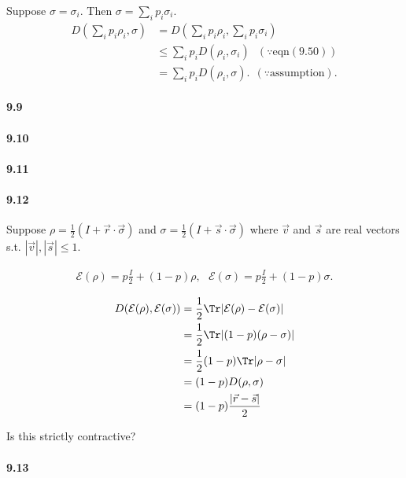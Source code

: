 Suppose $\sigma = \sigma_i$. Then $\sigma = \sum_i p_i \sigma_i$.
\begin{align}
	D \left( \sum_i p_i \rho_i, \sigma\right) &= D \left( \sum_i p_i \rho_i, \sum_i p_i \sigma_i\right)\\
		&\leq \sum_i p_i D(\rho_i, \sigma_i) ~~~ (\because \text{eqn}(9.50))\\
		&= \sum_i p_i D(\rho_i, \sigma).~~(\because \text{assumption}).
\end{align}

\paragraph{9.9}
\paragraph{9.10}
\paragraph{9.11}
\paragraph{9.12}

Suppose $\rho = \frac{1}{2} (I + \vec{r}\cdot \vec{\sigma})$ and $\sigma = \frac{1}{2} (I + \vec{s}\cdot \vec{\sigma})$ where $\vec{v}$ and $\vec{s}$ are real vectors s.t. $|\vec{v}|, |\vec{s}| \leq 1$.

\begin{align*}
	\mathcal{E} (\rho) = p \frac{I}{2} + (1-p) \rho, ~~~
	\mathcal{E}(\sigma) = p \frac{I}{2} + (1-p) \sigma.
\end{align*}

\begin{align*}
	D(\mathcal{E}(\rho), \mathcal{E}(\sigma)) &= \frac{1}{2} \Tr |\mathcal{E}(\rho) -  \mathcal{E}(\sigma)|\\
		&= \frac{1}{2} \Tr |(1-p)(\rho - \sigma)|\\
		&= \frac{1}{2}(1-p) \Tr |\rho - \sigma|\\
		&= (1-p) D(\rho, \sigma)\\
		&= (1-p) \frac{|\vec{r} - \vec{s}|}{2}
\end{align*}

Is this strictly contractive?

\paragraph{9.13}

